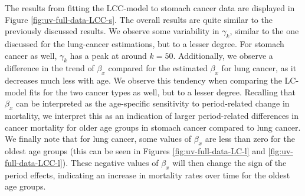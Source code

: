 \newpar The results from fitting the LCC-model to stomach cancer data are displayed in Figure \ref{fig:uv-full-data-LCC-s}. The overall results are quite similar to the previously discussed results. We observe some variability in $\gamma_k$, similar to the one discussed for the lung-cancer estimations, but to a lesser degree. For stomach cancer as well, $\gamma_k$ has a peak at around $k = 50$. Additionally, we observe a difference in the trend of $\beta_x$ compared for the estimated $\beta_x$ for lung cancer, as it decreases much less with age. We observe this tendency when comparing the LC-model fits for the two cancer types as well, but to a lesser degree. Recalling that $\beta_x$ can be interpreted as the age-specific sensitivity to period-related change in mortality, we interpret this as an indication of larger period-related differences in cancer mortality for older age groups in stomach cancer compared to lung cancer. We finally note that for lung cancer, some values of $\beta_x$ are less than zero for the oldest age groups (this can be seen in Figures \ref{fig:uv-full-data-LC-l} and \ref{fig:uv-full-data-LCC-l}). These negative values of $\beta_x$ will then change the sign of the period effects, indicating an increase in mortality rates over time for the oldest age groups. 




